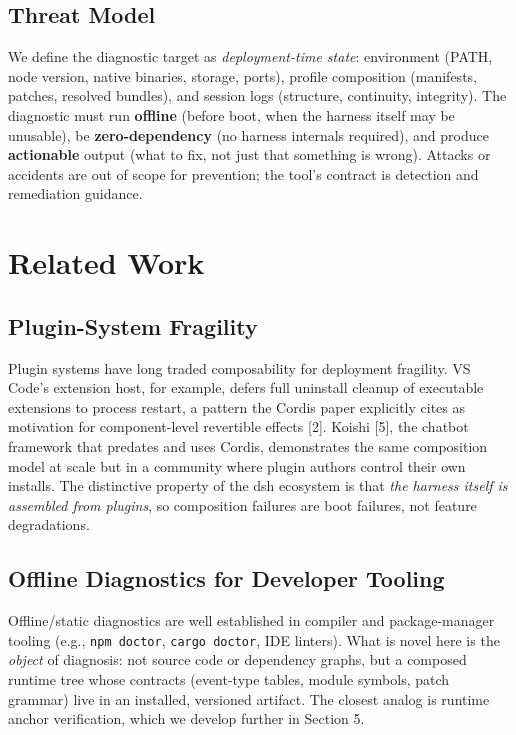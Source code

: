 \documentclass[11pt]{article}
\begin{document}
\subsection{Threat Model}\label{threat-model}

We define the diagnostic target as \emph{deployment-time state}:
environment (PATH, node version, native binaries, storage, ports),
profile composition (manifests, patches, resolved bundles), and session
logs (structure, continuity, integrity). The diagnostic must run
\textbf{offline} (before boot, when the harness itself may be unusable),
be \textbf{zero-dependency} (no harness internals required), and produce
\textbf{actionable} output (what to fix, not just that something is
wrong). Attacks or accidents are out of scope for prevention; the tool's
contract is detection and remediation guidance.

\section{Related Work}\label{related-work}

\subsection{Plugin-System
Fragility}\label{plugin-system-fragility}

Plugin systems have long traded composability for deployment fragility.
VS Code's extension host, for example, defers full uninstall cleanup of
executable extensions to process restart, a pattern the Cordis paper
explicitly cites as motivation for component-level revertible effects
[2]. Koishi [5], the chatbot framework that predates and uses
Cordis, demonstrates the same composition model at scale but in a
community where plugin authors control their own installs. The
distinctive property of the dsh ecosystem is that \emph{the harness
itself is assembled from plugins}, so composition failures are boot
failures, not feature degradations.

\subsection{Offline Diagnostics for Developer
Tooling}\label{offline-diagnostics-for-developer-tooling}

Offline/static diagnostics are well established in compiler and
package-manager tooling (e.g., \texttt{npm\ doctor},
\texttt{cargo\ doctor}, IDE linters). What is novel here is the
\emph{object} of diagnosis: not source code or dependency graphs, but a
composed runtime tree whose contracts (event-type tables, module
symbols, patch grammar) live in an installed, versioned artifact. The
closest analog is runtime anchor verification, which we develop further
in Section 5.
\end{document}
